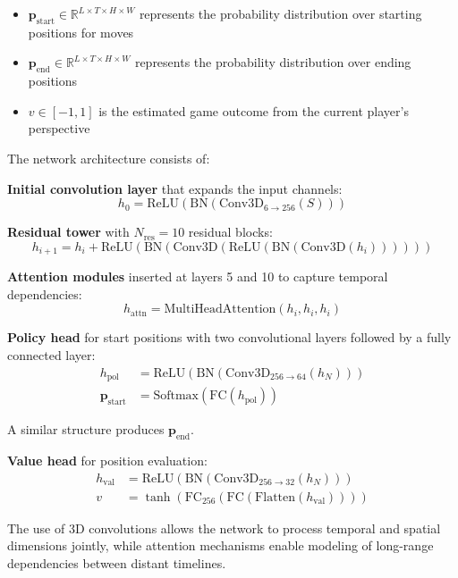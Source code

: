 \documentclass{article}
\begin{document}
\begin{itemize}
    \item $\mathbf{p}_{\text{start}} \in \mathbb{R}^{L \times T \times H \times W}$ represents the probability distribution over starting positions for moves
    \item $\mathbf{p}_{\text{end}} \in \mathbb{R}^{L \times T \times H \times W}$ represents the probability distribution over ending positions
    \item $v \in [-1, 1]$ is the estimated game outcome from the current player's perspective
\end{itemize}

The network architecture consists of:

\textbf{Initial convolution layer} that expands the input channels:
\begin{equation}
h_0 = \text{ReLU}(\text{BN}(\text{Conv3D}_{6 \to 256}(S)))
\end{equation}

\textbf{Residual tower} with $N_{\text{res}}=10$ residual blocks:
\begin{equation}
h_{i+1} = h_i + \text{ReLU}(\text{BN}(\text{Conv3D}(\text{ReLU}(\text{BN}(\text{Conv3D}(h_i))))))
\end{equation}

\textbf{Attention modules} inserted at layers 5 and 10 to capture temporal dependencies:
\begin{equation}
h_{\text{attn}} = \text{MultiHeadAttention}(h_i, h_i, h_i)
\end{equation}

\textbf{Policy head} for start positions with two convolutional layers followed by a fully connected layer:
\begin{align}
h_{\text{pol}} &= \text{ReLU}(\text{BN}(\text{Conv3D}_{256 \to 64}(h_N))) \\
\mathbf{p}_{\text{start}} &= \text{Softmax}(\text{FC}(h_{\text{pol}}))
\end{align}

A similar structure produces $\mathbf{p}_{\text{end}}$.

\textbf{Value head} for position evaluation:
\begin{align}
h_{\text{val}} &= \text{ReLU}(\text{BN}(\text{Conv3D}_{256 \to 32}(h_N))) \\
v &= \tanh(\text{FC}_{256}(\text{FC}(\text{Flatten}(h_{\text{val}}))))
\end{align}

The use of 3D convolutions allows the network to process temporal and spatial dimensions jointly, while attention mechanisms enable modeling of long-range dependencies between distant timelines.
\end{document}
